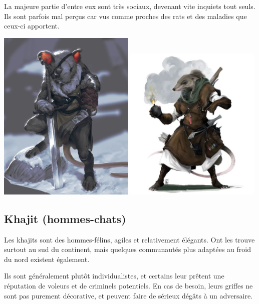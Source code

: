 \documentclass[10pt,a4paper]{book}
\begin{document}
La majeure partie d'entre eux sont très sociaux, devenant vite inquiets tout seuls. Ils sont parfois mal perçus car vus comme proches des rats et des maladies que ceux-ci apportent.


\includegraphics[width=0.49\textwidth]{ysoki 2}
\includegraphics[width=0.49\textwidth]{ysoki 3}
\subsection{Khajit (hommes-chats)}
Les khajits sont des hommes-félins, agiles et relativement élégants. Ont les trouve surtout au sud du continent, mais quelques communautés plus adaptées au froid du nord existent également. 

Ils sont généralement plutôt individualistes, et certains leur prêtent une réputation de voleurs et de criminels potentiels. En cas de besoin, leurs griffes ne sont pas purement décorative, et peuvent faire de sérieux dégâts à un adversaire.
\end{document}

